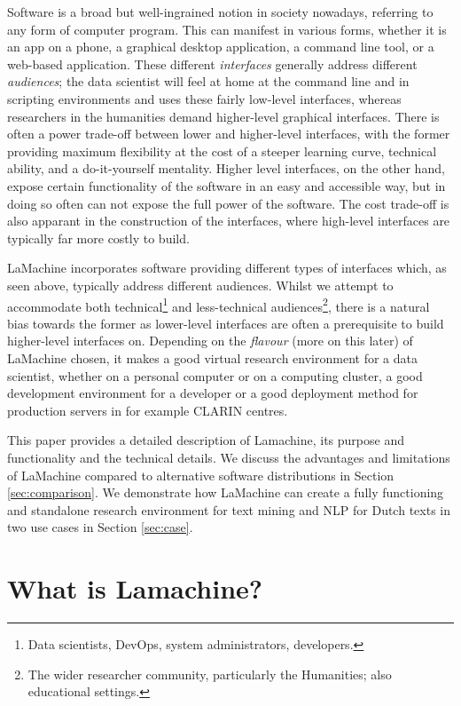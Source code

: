 \documentclass[a4paper,11pt]{article}
\begin{document}
Software is a broad but well-ingrained notion in society nowadays, referring to any form of computer program. This can
manifest in various forms, whether it is an app on a phone, a graphical desktop application, a command line tool, or a
web-based application. These different \emph{interfaces} generally address different \emph{audiences}; the data
scientist will feel at home at the command line and in scripting environments and uses these fairly low-level
interfaces, whereas researchers in the humanities demand higher-level graphical interfaces. There is often a power trade-off
between lower and higher-level interfaces, with the former providing maximum flexibility at the cost of a steeper
learning curve, technical ability, and a do-it-yourself mentality. Higher level interfaces, on the other
hand, expose certain functionality of the software in an easy and accessible way, but in doing so often can not expose
the full power of the software. The cost trade-off is also apparant in the construction of the interfaces, where
high-level interfaces are typically far more costly to build.

LaMachine incorporates software providing different types of interfaces which, as seen above, typically address different audiences. Whilst we
attempt to accommodate both technical\footnote{Data scientists, DevOps, system administrators, developers.} and
less-technical audiences\footnote{The wider researcher community, particularly the Humanities; also educational
settings.}, there is a natural bias towards the former as lower-level interfaces are often a prerequisite to build
higher-level interfaces on. Depending on the \emph{flavour} (more on this later) of LaMachine chosen, it makes a good virtual research
environment for a data scientist, whether on a personal computer or on a computing cluster, a good development
environment for a developer or a good deployment method for production servers in for example CLARIN centres.

 This paper provides a detailed description of Lamachine, its purpose and functionality and the technical details. We
 discuss the advantages and limitations of LaMachine compared to alternative software distributions in Section \ref{sec:comparison}. We demonstrate how LaMachine can create a fully functioning and standalone research environment for text mining  and NLP for Dutch texts in two use cases in Section \ref{sec:case}.

 \section{What is Lamachine?}
\end{document}
